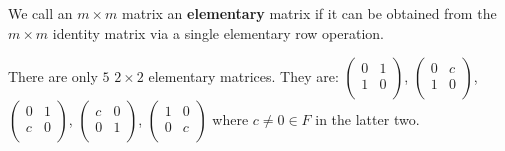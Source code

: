 \begin{definition}
    We call an $m \times m$ matrix an \textbf{elementary} matrix if it can be obtained from the $m
    \times m$ identity matrix via a single elementary row operation.
\end{definition}

\begin{example}
    There are only $5$  $2 \times 2$ elementary matrices. They are: 
    $\begin{pmatrix}
        0 & 1 \\
        1 & 0 \\
    \end{pmatrix}$,
    $\begin{pmatrix}
        0 & c \\
        1 & 0 \\
    \end{pmatrix}$,
     $\begin{pmatrix}
        0 & 1 \\
        c & 0 \\
    \end{pmatrix}$,
    $\begin{pmatrix}
        c & 0 \\
        0 & 1 \\
    \end{pmatrix}$,
    $\begin{pmatrix}
        1 & 0 \\
        0 & c \\
    \end{pmatrix}$
    where $c \neq 0 \in F$ in the latter two.
\end{example} 

